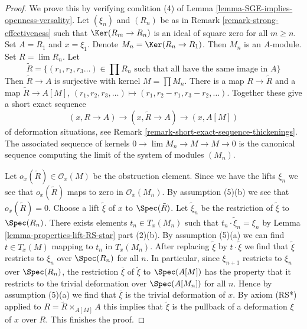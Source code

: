\begin{proof}
We prove this by verifying condition (4) of
Lemma \ref{lemma-SGE-implies-openness-versality}.
Let $(\xi_n)$ and $(R_n)$ be as in Remark \ref{remark-strong-effectiveness}
such that $\Ker(R_m \to R_n)$ is an ideal of square zero
for all $m \geq n$. Set $A = R_1$ and $x = \xi_1$.
Denote $M_n = \Ker(R_n \to R_1)$.
Then $M_n$ is an $A$-module. Set $R = \lim R_n$.
Let
$$
\tilde R = \{(r_1, r_2, r_3 \ldots) \in \prod R_n
\text{ such that all have the same image in }A\}
$$
Then $\tilde R \to A$ is surjective with kernel $M = \prod M_n$.
There is a map $R \to \tilde R$ and a map
$\tilde R \to A[M]$, $(r_1, r_2, r_3, \ldots) \mapsto
(r_1, r_2 - r_1, r_3 - r_2, \ldots)$.
Together these give a short exact sequence
$$
(x, R \to A) \to (x, \tilde R \to A) \to (x, A[M])
$$
of deformation situations, see
Remark \ref{remark-short-exact-sequence-thickenings}.
The associated sequence of kernels
$0 \to \lim M_n \to M \to M \to 0$
is the canonical sequence computing the limit
of the system of modules $(M_n)$.

\medskip\noindent
Let $o_x(\tilde R) \in \mathcal{O}_x(M)$ be the obstruction element.
Since we have the lifts $\xi_n$ we see that $o_x(\tilde R)$
maps to zero in $\mathcal{O}_x(M_n)$. By assumption (5)(b)
we see that $o_x(\tilde R) = 0$. Choose a lift $\tilde \xi$
of $x$ to $\Spec(\tilde R)$. Let $\tilde \xi_n$ be the
restriction of $\tilde \xi$ to $\Spec(R_n)$. There exists
elements $t_n \in T_x(M_n)$ such that
$t_n \cdot \tilde \xi_n = \xi_n$ by
Lemma \ref{lemma-properties-lift-RS-star} part (2)(b).
By assumption (5)(a) we can find $t \in T_x(M)$
mapping to $t_n$ in $T_x(M_n)$. After replacing
$\tilde \xi$ by $t \cdot \tilde \xi$ we find that
$\tilde \xi$ restricts to $\xi_n$ over $\Spec(R_n)$ for all $n$.
In particular, since $\xi_{n + 1}$ restricts to $\xi_n$
over $\Spec(R_n)$, the restriction $\overline{\xi}$ of $\tilde \xi$
to $\Spec(A[M])$ has the property that it restricts to
the trivial deformation over $\Spec(A[M_n])$ for all $n$.
Hence by assumption (5)(a) we find that $\overline{\xi}$
is the trivial deformation of $x$. By axiom (RS*)
applied to $R = \tilde R \times_{A[M]} A$
this implies that $\tilde \xi$ is the pullback
of a deformation $\xi$ of $x$ over $R$. This finishes the proof.
\end{proof}

